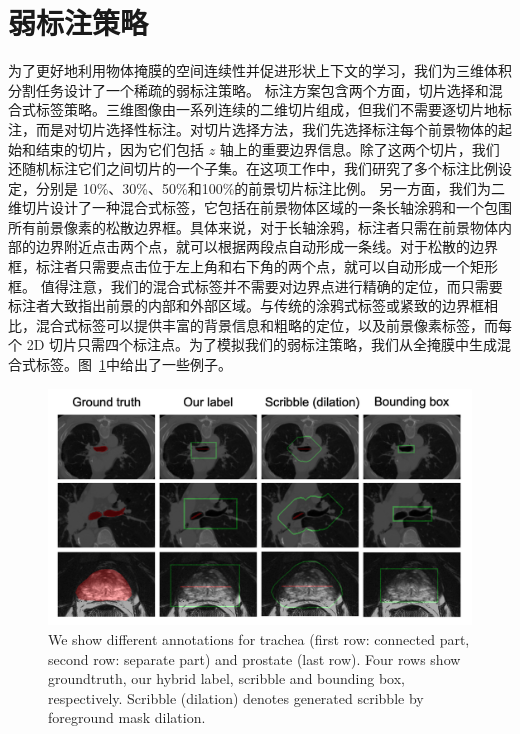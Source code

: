 \section{弱标注策略}
为了更好地利用物体掩膜的空间连续性并促进形状上下文的学习，我们为三维体积分割任务设计了一个稀疏的弱标注策略。
标注方案包含两个方面，切片选择和混合式标签策略。三维图像由一系列连续的二维切片组成，但我们不需要逐切片地标注，而是对切片选择性标注。对切片选择方法，我们先选择标注每个前景物体的起始和结束的切片，因为它们包括 $z$ 轴上的重要边界信息。除了这两个切片，我们还随机标注它们之间切片的一个子集。在这项工作中，我们研究了多个标注比例设定，分别是 10\%、30\%、50\%和100\%的前景切片标注比例。
另一方面，我们为二维切片设计了一种混合式标签，它包括在前景物体区域的一条长轴涂鸦和一个包围所有前景像素的松散边界框。具体来说，对于长轴涂鸦，标注者只需在前景物体内部的边界附近点击两个点，就可以根据两段点自动形成一条线。对于松散的边界框，标注者只需要点击位于左上角和右下角的两个点，就可以自动形成一个矩形框。
值得注意，我们的混合式标签并不需要对边界点进行精确的定位，而只需要标注者大致指出前景的内部和外部区域。与传统的涂鸦式标签或紧致的边界框相比，混合式标签可以提供丰富的背景信息和粗略的定位，以及前景像素标签，而每个 2D 切片只需四个标注点。为了模拟我们的弱标注策略，我们从全掩膜中生成混合式标签。图~\ref{fig:weak_annotation}中给出了一些例子。

    \begin{figure}[t!]
        \centering 
        \includegraphics[width=1.0\textwidth]{img/c3/c_weak_annotation3.png}
        {We show different annotations for trachea (first row: connected part, second row: separate part) and prostate (last row). Four rows show groundtruth, our hybrid label, scribble and bounding box, respectively. Scribble (dilation) denotes generated scribble by foreground mask dilation.}
        \label{fig:weak_annotation}
    \end{figure}

